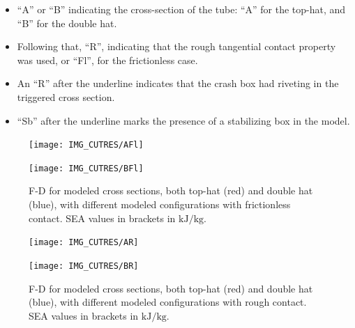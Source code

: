 \documentclass[cmfonts]{witpress}
\begin{document}
\begin{itemize}
	\item ``A'' or ``B'' indicating the cross-section of the tube: ``A'' for the top-hat, and ``B'' for the double hat.

	\item Following that, ``R'', indicating that the rough tangential contact property was used, or ``Fl'', for the frictionless case.

	\item An ``R'' after the underline indicates that the crash box had riveting in the triggered cross section.

	\item ``Sb'' after the underline marks the presence of a stabilizing box in the model.
\end{itemize}

\begin{figure}
	\centering
	\begin{minipage}[b]{.9\linewidth}
		\centering
		\texttt{[image: IMG\_CUTRES/AFl]}
	\end{minipage}
	\quad
	\begin{minipage}[b]{.9\linewidth}
		\centering
		\texttt{[image: IMG\_CUTRES/BFl]}
	\end{minipage}
	\caption[F-D for modeled cross sections, both top-hat and double hat, with different modeled configurations with frictionless contact.]{F-D for modeled cross sections, both top-hat (red) and double hat (blue), with different modeled configurations with frictionless contact. SEA values in brackets in $\si{\kJ/\kg}$.}
	\label{fig:F-D_frictionless}
\end{figure}

\begin{figure}
	\centering
	\begin{minipage}[b]{.9\linewidth}
		\centering
		\texttt{[image: IMG\_CUTRES/AR]}
	\end{minipage}
	\quad
	\begin{minipage}[b]{.9\linewidth}
		\centering
		\texttt{[image: IMG\_CUTRES/BR]}
	\end{minipage}
	\caption[F-D for modeled cross sections, both top-hat and double hat, with different modeled configurations with rough contact.]{F-D for modeled cross sections, both top-hat (red) and double hat (blue), with different modeled configurations with rough contact. SEA values in brackets in $\si{\kJ/\kg}$.}
	\label{fig:F-D_rough}
\end{figure}
\end{document}
